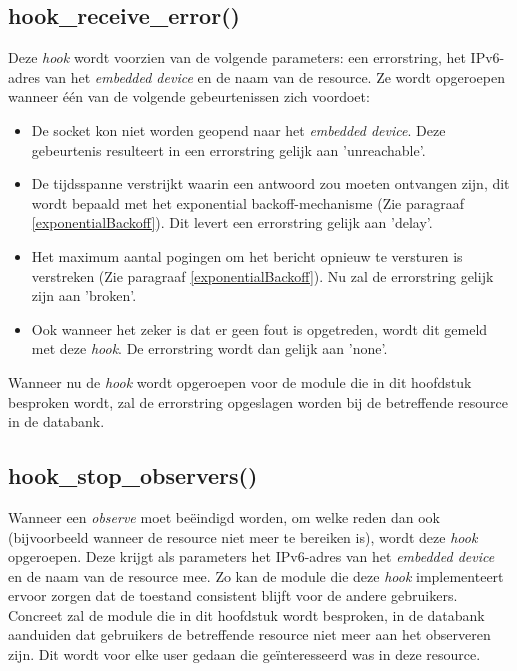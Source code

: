 \subsection{hook\_receive\_error()}
Deze \textit{hook} wordt voorzien van de volgende parameters: een errorstring, het IPv6-adres van het \textit{embedded device} en de naam van de resource. Ze wordt opgeroepen wanneer \'{e}\'{e}n van de volgende gebeurtenissen zich voordoet:
\begin{itemize}
\item De socket kon niet worden geopend naar het \textit{embedded device}. Deze gebeurtenis resulteert in een errorstring gelijk aan 'unreachable'.
\item De tijdsspanne verstrijkt waarin een antwoord zou moeten ontvangen zijn, dit wordt bepaald met het exponential backoff-mechanisme (Zie paragraaf \ref{exponentialBackoff}). Dit levert een errorstring gelijk aan 'delay'.
\item Het maximum aantal pogingen om het bericht opnieuw te versturen is verstreken (Zie paragraaf \ref{exponentialBackoff}). Nu zal de errorstring gelijk zijn aan 'broken'.
\item Ook wanneer het zeker is dat er geen fout is opgetreden, wordt dit gemeld met deze \textit{hook}. De errorstring wordt dan gelijk aan 'none'.
\end{itemize}
Wanneer nu de \textit{hook} wordt opgeroepen voor de module die in dit hoofdstuk besproken wordt, zal de errorstring opgeslagen worden bij de betreffende resource in de databank.

\subsection{hook\_stop\_observers()}
Wanneer een \textit{observe} moet be\"{e}indigd worden, om welke reden dan ook (bijvoorbeeld wanneer de resource niet meer te bereiken is), wordt deze \textit{hook} opgeroepen. Deze krijgt als parameters het IPv6-adres van het \textit{embedded device} en de naam van de resource mee. Zo kan de module die deze \textit{hook} implementeert ervoor zorgen dat de toestand consistent blijft voor de andere gebruikers.\\
Concreet zal de module die in dit hoofdstuk wordt besproken, in de databank aanduiden dat gebruikers de betreffende resource niet meer aan het observeren zijn. Dit wordt voor elke user gedaan die ge\"{i}nteresseerd was in deze resource.